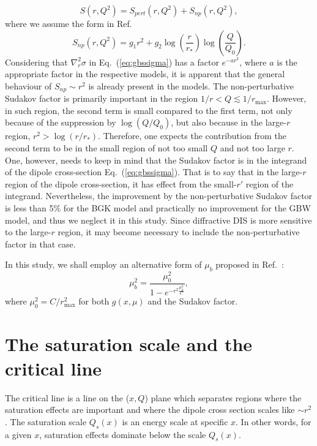 \documentclass[11pt]{article}
\begin{document}
\begin{equation}
S(r,Q^2)= S_{pert}(r,Q^2)+S_{np}(r,Q^2),
\end{equation}
where we assume the form in Ref.~\cite{prokudin2015}
\begin{equation}
S_{np}(r,Q^2)=g_1r^2+g_2\log\left(\frac{r}{r_*}\right)\log\left(\frac{Q}{Q_0}\right).
\end{equation}
Considering that $\nabla^2_r \sigma$ in Eq.~(\ref{eq:gbssigma}) has a factor $e^{-a r^2}$, where $a$ is the appropriate factor in the respective models, it is apparent that the general behaviour of $S_{np}\sim r^2$ is already present in the models. 
The non-perturbative Sudakov factor is primarily important in the region $1/r<Q\lesssim 1/r_{\mathrm{max}}$. However, in such region, the second term is small compared to the first term, not only because of the suppression by $\log(Q/Q_0)$, but also because in the large-$r$ region, $r^2>\log\left({r}/{r_*}\right)$.  Therefore, one expects the contribution from the second term to be in the small region of not too small $Q$ and not too large $r$. One, however, needs to keep in mind that the Sudakov factor is in the integrand of the dipole cross-section Eq.~(\ref{eq:gbssigma}). That is to say that in the large-$r$ region of the dipole cross-section, it has effect from the small-$r'$ region of the integrand.
Nevertheless, the improvement by the non-perturbative Sudakov factor is less than 5\% for the BGK model and practically no improvement for the GBW model, and thus we neglect it in this study. Since diffractive DIS is more sensitive to the large-$r$ region, it may become necessary to include the non-perturbative factor in that case.

In this study, we shall employ an alternative form of $\mu_b$ proposed in Ref.~\cite{gbs2018}:
\begin{equation}
\mu_b^2= \frac{\mu_0^2}{1-e^{-r^2\frac{\mu_0^2}{C} }},
\label{eq:newstar}
\end{equation}
where $\mu_0^2=C/r_{\mathrm{max}}^2$ for both $g(x,\mu)$ and the Sudakov factor.




\section{The saturation scale and the critical line}
The critical line is a line on the ($x,Q$) plane which separates regions where the saturation effects are important and  where the dipole cross section scales like $\sim r^2$.
The saturation scale $Q_s(x)$ is an energy scale at specific $x$. In other words, for a given $x$, saturation effects dominate below the scale $Q_s(x)$.
\end{document}
